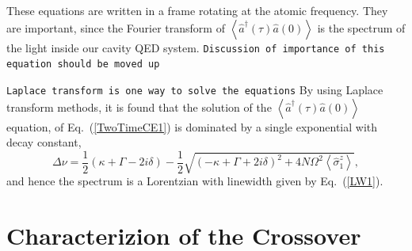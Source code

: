 \documentclass[aps,prl,twocolumn,
superscriptaddress,groupedaddress]{revtex4}
\newcommand{\dmcomment}[1]{{\tt #1}}
\begin{document}
These equations are written in a frame rotating at the atomic frequency.
They are important, since the Fourier transform of
$\left<\hat{a}^{\dagger}(\tau)\hat{a}(0)\right>$ is the spectrum of the
light inside our cavity QED system.  \dmcomment{Discussion of importance
of this equation should be moved up}


\dmcomment{Laplace transform is one way to solve the equations} By using
Laplace transform methods, it is found that the solution of the
$\left<\hat{a}^{\dagger}(\tau)\hat{a}(0)\right>$ equation, of
Eq.~(\ref{TwoTimeCE1}) is dominated by a single exponential with decay
constant,
\begin{equation}
\Delta \nu = \frac{1}{2}(\kappa+\Gamma-2i\delta) -
\frac{1}{2} \sqrt{(-\kappa+\Gamma+2i\delta)^2 +
4N\Omega^2 \left<\hat{\sigma}_{1}^{z}\right>},
\label{LW1}
\end{equation}
and hence the spectrum is a Lorentzian with linewidth given by
Eq.~(\ref{LW1}).


\section{Characterizion of the Crossover}
\end{document}
